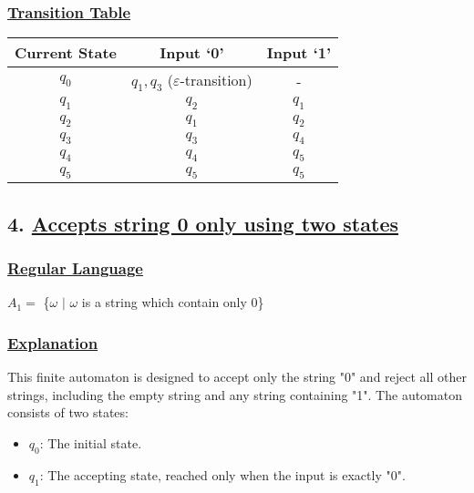\documentclass[12pt]{article}
\begin{document}
	\subsubsection*{\underline{Transition Table}}
	\begin{center}
		\begin{tabular}{ccc}
			\toprule
			\textbf{Current State} & \textbf{Input `0'} & \textbf{Input `1'} \\
			\midrule
			$q_0$ & $q_1, q_3$ (\(\varepsilon\)-transition) & - \\
			$q_1$ & $q_2$ & $q_1$ \\
			$q_2$ & $q_1$ & $q_2$ \\
			$q_3$ & $q_3$ & $q_4$ \\
			$q_4$ & $q_4$ & $q_5$ \\
			$q_5$ & $q_5$ & $q_5$ \\
			\bottomrule
		\end{tabular}
	\end{center}
	
	\newpage
	\subsection*{4. \underline{Accepts string 0 only using two states} } 
	\vspace{2mm}
	\subsubsection*{\underline{Regular Language}}
	\begin{tcolorbox}[colback=white,colframe=transitioncol,arc=0mm]
		$A_1 =$ \{$\omega$ $|$ $\omega$ is a string which contain only 0\}
	\end{tcolorbox}
	
	\subsubsection*{\underline{Explanation}}
	This finite automaton is designed to accept only the string "0" and reject all other strings, including the empty string and any string containing "1". The automaton consists of two states:
	
	\begin{itemize}
		\item $q_0$: The initial state.
		\item $q_1$: The accepting state, reached only when the input is exactly "0".
	\end{itemize}
	
\end{document}
